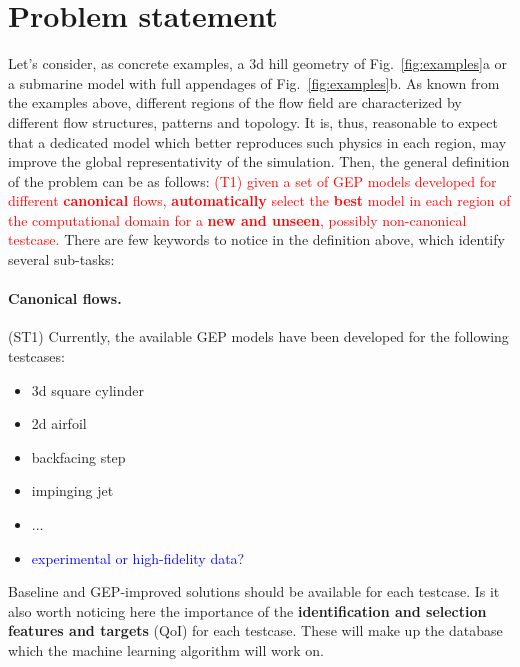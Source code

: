 \documentclass[crop=false]{standalone}
\begin{document}
\section{Problem statement}
Let's consider, as concrete examples, a 3d hill geometry of Fig.~\ref{fig:examples}a or a submarine model with full appendages of Fig.~\ref{fig:examples}b.
%
%
\noindent As known from the examples above, different regions of the flow field are characterized by different flow structures, patterns and topology. It is, thus, reasonable to expect that a dedicated model which better reproduces such physics in each region, may improve the global representativity of the simulation. Then, the general definition of the problem can be as follows:
\textcolor{red}{(T1) given a set of GEP models developed for different \textbf{canonical} flows, \textbf{automatically} select the \textbf{best} model in each region of the computational domain for a \textbf{new and unseen}, possibly non-canonical testcase.}
%
\vspace{10pt}
\noindent There are few keywords to notice in the definition above, which identify several sub-tasks:
\paragraph{Canonical flows.} (ST1) Currently, the available GEP models have been developed for the following testcases:
\begin{itemize}
    \item 3d square cylinder
    \item 2d airfoil
    \item backfacing step
    \item impinging jet
    \item ...
    \item \textcolor{blue}{experimental or high-fidelity data?}
\end{itemize}
Baseline and GEP-improved solutions should be available for each testcase. Is it also worth noticing here the importance of the \textbf{identification and selection features and targets} (QoI) for each testcase. These will make up the database which the machine learning algorithm will work on. 
\end{document}
